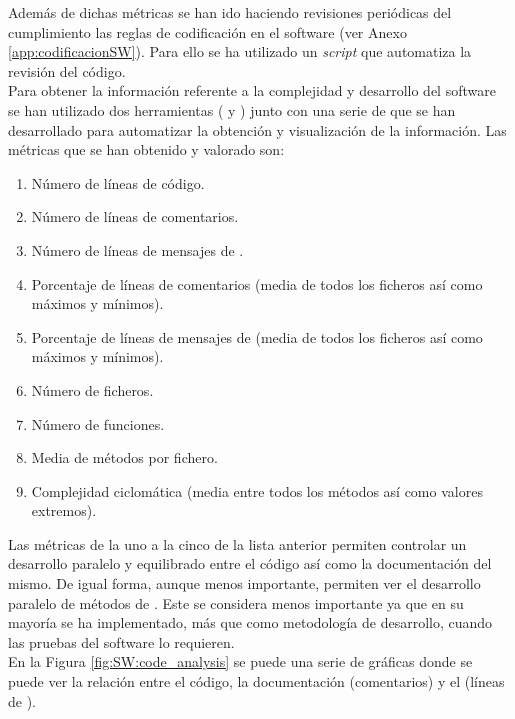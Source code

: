     Además de dichas métricas se han ido haciendo revisiones periódicas del cumplimiento las reglas de codificación en el software (ver Anexo \ref{app:codificacionSW}). Para ello se ha utilizado un \textit{script}  que automatiza la revisión del código.
    \\
    
    Para obtener la información referente a la complejidad y desarrollo del software se han utilizado dos herramientas ( y ) junto con una serie de  que se han desarrollado para automatizar la obtención y visualización de la información. Las métricas que se han obtenido y valorado son:
    
    \begin{enumerate}
        \item Número de líneas de código.
        \item Número de líneas de comentarios.
        \item Número de líneas de mensajes de .
        \item Porcentaje de líneas de comentarios (media de todos los ficheros así como máximos y mínimos).
        \item Porcentaje de líneas de mensajes de  (media de todos los ficheros así como máximos y mínimos).
        \item Número de ficheros.
        \item Número de funciones.
        \item Media de métodos por fichero.
        \item Complejidad ciclomática  (media entre todos los métodos así como valores extremos).
    \end{enumerate}
    
    Las métricas de la uno a la cinco de la lista anterior permiten controlar un desarrollo paralelo y equilibrado entre el código así como la documentación del mismo. De igual forma, aunque menos importante, permiten ver el desarrollo paralelo de métodos de . Este se considera menos importante ya que en su mayoría se ha implementado, más que como metodología de desarrollo, cuando las pruebas del software lo requieren.
    \\ 
    
    En la Figura \ref{fig:SW:code_analysis} se puede una serie de gráficas donde se puede ver la relación entre el código, la documentación (comentarios) y el  (líneas de ). 
    
